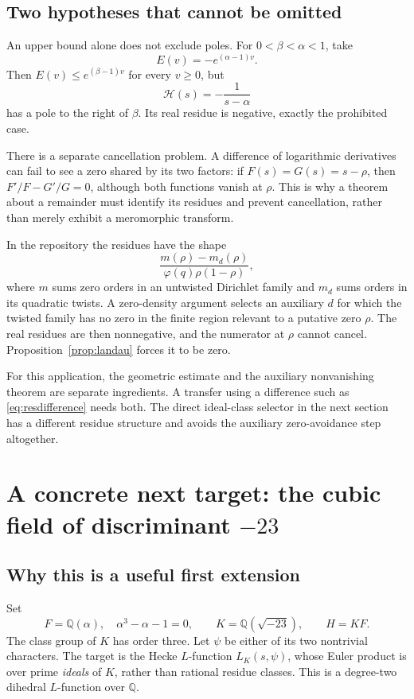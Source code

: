 \documentclass[11pt,letterpaper]{article}
\theoremstyle{definition}\newtheorem{definition}[theorem]{Definition}
\theoremstyle{remark}\newtheorem{remark}[theorem]{Remark}
\newcommand{\Q}{\mathbb Q}\newcommand{\R}{\mathbb R}\newcommand{\C}{\mathbb C}
\begin{document}
\subsection{Two hypotheses that cannot be omitted}
An upper bound alone does not exclude poles. For $0<\beta<\alpha<1$, take
\[
 E(v)=-e^{(\alpha-1)v}.
\]
Then $E(v)\le e^{(\beta-1)v}$ for every $v\ge0$, but
\[
 \mathcal H(s)=-\frac1{s-\alpha}
\]
has a pole to the right of $\beta$. Its real residue is negative, exactly the prohibited case.

There is a separate cancellation problem. A difference of logarithmic derivatives can fail
to see a zero shared by its two factors: if $F(s)=G(s)=s-\rho$, then
$F'/F-G'/G=0$, although both functions vanish at $\rho$.
This is why a theorem about a remainder must identify its residues and prevent cancellation,
rather than merely exhibit a meromorphic transform.

In the repository the residues have the shape
\begin{equation}\label{eq:resdifference}
 \frac{m(\rho)-m_d(\rho)}{\varphi(q)\rho(1-\rho)},
\end{equation}
where $m$ sums zero orders in an untwisted Dirichlet family and $m_d$ sums orders in its
quadratic twists. A zero-density argument selects an auxiliary $d$ for which the twisted
family has no zero in the finite region relevant to a putative zero $\rho$.
The real residues are then nonnegative, and the numerator at $\rho$ cannot cancel.
Proposition~\ref{prop:landau} forces it to be zero.\cite{criterion}

For this application, the geometric estimate and the auxiliary nonvanishing theorem are
separate ingredients. A transfer using a difference such as \eqref{eq:resdifference} needs
both. The direct ideal-class selector in the next section has a different residue structure
and avoids the auxiliary zero-avoidance step altogether.

\section{A concrete next target: the cubic field of discriminant \texorpdfstring{$-23$}{-23}}
\subsection{Why this is a useful first extension}
Set
\[
 F=\Q(\alpha),\quad\alpha^3-\alpha-1=0,\qquad
 K=\Q(\sqrt{-23}),\qquad H=KF.
\]
The class group of $K$ has order three. Let $\psi$ be either of its two nontrivial characters.
The target is the Hecke $L$-function $L_K(s,\psi)$, whose Euler product is over prime
\emph{ideals} of $K$, rather than rational residue classes. This is a degree-two
dihedral $L$-function over $\Q$.
\end{document}
